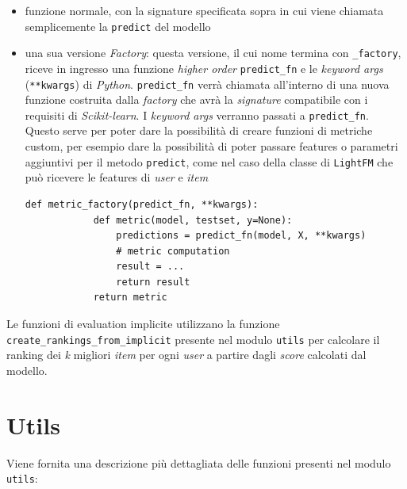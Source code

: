 \begin{itemize}
    \item funzione normale, con la signature specificata sopra in cui viene chiamata semplicemente la \texttt{predict} del modello
    \item una sua versione \textit{Factory}: questa versione, il cui nome termina con \texttt{\_factory}, riceve in ingresso una funzione \textit{higher order} \texttt{predict\_fn} e le \textit{keyword args} (\texttt{**kwargs}) di \textit{Python}. \texttt{predict\_fn} verrà chiamata all'interno di una nuova funzione costruita dalla \textit{factory} che avrà la \textit{signature} compatibile con i requisiti di \textit{Scikit-learn}. I \textit{keyword args} verranno passati a \texttt{predict\_fn}. Questo serve per poter dare la possibilità di creare funzioni di metriche custom, per esempio dare la possibilità di poter passare features o parametri aggiuntivi per il metodo \texttt{predict}, come nel caso della classe di \texttt{LightFM} che può ricevere le features di \textit{user} e \textit{item}
    \begin{lstlisting}[caption=Implementazione in pseudo codice di una \textit{factory} per una metrica generica ]
        def metric_factory(predict_fn, **kwargs):
            def metric(model, testset, y=None):
                predictions = predict_fn(model, X, **kwargs)
                # metric computation
                result = ...
                return result
            return metric
    \end{lstlisting}
\end{itemize}

Le funzioni di evaluation implicite utilizzano la funzione \\ \texttt{create\_rankings\_from\_implicit} presente nel modulo \texttt{utils} per calcolare il ranking dei \textit{k} migliori \textit{item} per ogni \textit{user} a partire dagli \textit{score} calcolati dal modello.

\section{Utils}

Viene fornita una descrizione più dettagliata delle funzioni presenti nel modulo \texttt{utils}:

